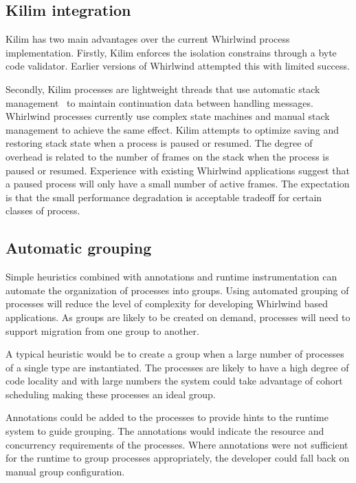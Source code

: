 \documentclass[conference]{IEEEtran}
\begin{document}
\subsection{Kilim integration}

Kilim has two main advantages over the current Whirlwind process implementation. Firstly, Kilim enforces the isolation constrains through a byte code validator. Earlier versions of Whirlwind attempted this with limited success. 

Secondly, Kilim processes are lightweight threads that use automatic stack management~\cite{Adya02Cooperative} to maintain continuation data between handling messages. 
Whirlwind processes currently use complex state machines and manual stack management to achieve the same effect. Kilim attempts to optimize saving and restoring stack state when a process is paused or resumed. The degree of overhead is related to the number of frames on the stack when the process is paused or resumed. Experience with existing Whirlwind applications suggest that a paused process will only have a small number of active frames. The expectation is that the small performance degradation is acceptable tradeoff for certain classes of process.

\subsection{Automatic grouping}

Simple heuristics combined with annotations and runtime instrumentation can automate the organization of processes into groups. Using automated grouping of processes will reduce the level of complexity for developing Whirlwind based applications. As groups are likely to be created on demand, processes will need to support migration from one group to another.

A typical heuristic would be to create a group when a large number of processes of a single type are instantiated. The processes are likely to have a high degree of code locality and with large numbers the system could take advantage of cohort scheduling making these processes an ideal group.

Annotations could be added to the processes to provide hints to the runtime system to guide grouping. The annotations would indicate the resource and concurrency requirements of the processes. Where annotations were not sufficient for the runtime to group processes appropriately, the developer could fall back on manual group configuration.
\end{document}
